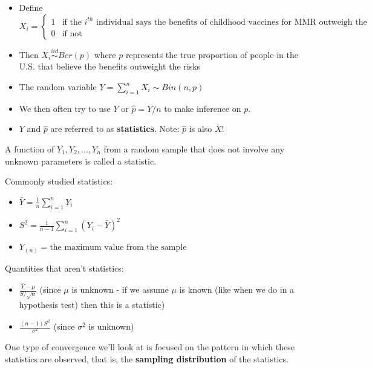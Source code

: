 \documentclass[
]{article}
\providecommand{\tightlist}{%
  \setlength{\itemsep}{0pt}\setlength{\parskip}{0pt}}
\begin{document}
\begin{itemize}
\tightlist
\item
  Define
  \(X_i = \begin{cases} 1 & \mbox{if the }i^{th}\mbox{ individual says the benefits of childhood vaccines for MMR outweigh the risks}\\ 0 & \mbox{if not}\end{cases}\)
\item
  Then \(X_i\stackrel{iid}\sim Ber(p)\) where \(p\) represents the true
  proportion of people in the U.S. that believe the benefits outweight
  the risks
\item
  The random variable \(Y = \sum_{i=1}^{n}X_i \sim Bin(n,p)\)
\item
  We then often try to use \(Y\) or \(\hat{p}=Y/n\) to make inference on
  \(p\).
\item
  \(Y\) and \(\hat{p}\) are referred to as \textbf{statistics}. Note:
  \(\hat{p}\) is also \(\bar{X}\)!
\end{itemize}

\begin{description}
\tightlist
\item[Statistic]
A function of \(Y_1,Y_2,...,Y_n\) from a random sample that does not
involve any unknown parameters is called a statistic.
\end{description}

Commonly studied statistics:

\begin{itemize}
\tightlist
\item
  \(\bar{Y} = \frac{1}{n}\sum_{i=1}^n Y_i\)
\item
  \(S^2 = \frac{1}{n-1}\sum_{i=1}^{n}(Y_i-\bar{Y})^2\)
\item
  \(Y_{(n)} = \mbox{the maximum value from the sample}\)
\end{itemize}

Quantities that aren't statistics:

\begin{itemize}
\tightlist
\item
  \(\frac{\bar{Y}-\mu}{S/\sqrt{n}}\) (since \(\mu\) is unknown - if we
  assume \(\mu\) is known (like when we do in a hypothesis test) then
  this is a statistic)
\item
  \(\frac{(n-1)S^2}{\sigma^2}\) (since \(\sigma^2\) is unknown)
\end{itemize}

One type of convergence we'll look at is focused on the pattern in which
these statistics are observed, that is, the \textbf{sampling
distribution} of the statistics.
\end{document}
